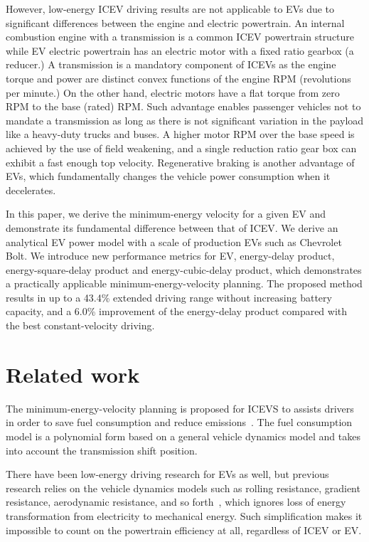\documentclass{IEEEtran}
\begin{document}
However, low-energy ICEV driving results are not applicable to EVs due to significant differences 
between the engine  and electric  powertrain. An internal combustion engine with a transmission is a common ICEV powertrain structure while EV electric powertrain has an electric motor with a fixed ratio gearbox (a reducer.) A transmission is a mandatory component of ICEVs as the engine torque and power are distinct convex functions of the engine RPM (revolutions per minute.) On the other hand, electric motors have a flat torque from zero RPM to the base (rated) RPM. Such advantage enables passenger vehicles not to mandate a transmission as long as there is not significant variation in the payload like a heavy-duty trucks and buses. A higher motor RPM over the base speed is achieved by the use of field weakening, and a single reduction ratio gear box can exhibit a fast enough top velocity. Regenerative braking is another advantage of EVs, which fundamentally changes the vehicle power consumption when it decelerates.

In this paper, we derive the minimum-energy velocity for a given EV and demonstrate its fundamental difference between that of ICEV. 
We derive an analytical EV power model with a scale of production EVs such as Chevrolet  Bolt. We introduce new performance metrics for EV, energy-delay product, energy-square-delay product and energy-cubic-delay product, which demonstrates a practically applicable minimum-energy-velocity planning. The proposed method results in up to a 43.4\% extended driving range without increasing battery capacity, and a 6.0\% improvement of the energy-delay product compared with the best constant-velocity driving. 

\section{Related work} \label{sec:related work}
  
The minimum-energy-velocity planning is proposed for ICEVS to assists drivers in order to save fuel consumption and reduce emissions~\cite{Seraens:thesis12, Kamal:TITS11, Ozatay:TITS14, Dovgana:ASC14, Ozatay:IFAC14, Khayyam:ESA12}.  
The fuel consumption model is a polynomial form based on a general vehicle dynamics model and takes into account the transmission shift position. 

There have been low-energy driving research for EVs as well, but previous research relies on the  vehicle dynamics models such as rolling resistance, gradient resistance, aerodynamic resistance, and so forth~\cite{Yan:NAPS14}, which ignores loss of energy transformation from electricity to mechanical energy. Such simplification makes it impossible to count on the powertrain efficiency at all, regardless of ICEV or EV. 
\end{document}
